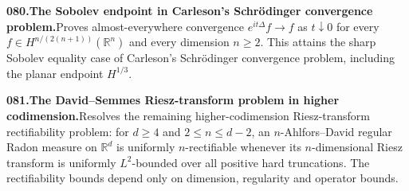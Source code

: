 \documentclass[11pt,a4paper]{article}
\begin{document}
  \par \begin{minipage}{\linewidth}
  \fontsize{10.5}{12.6}\selectfont\RaggedRight
  \hypertarget{result 080}{}
  {\bfseries\textcolor{muted}{080.}\enspace The Sobolev endpoint in Carleson's Schr\"odinger convergence problem.}\enspace Proves almost-everywhere convergence $e^{it\Delta}f\to f$ as $t\downarrow0$ for every $f\in H^{n/(2(n+1))}(\mathbb R^n)$ and every dimension $n\ge2$. This attains the sharp Sobolev equality case of Carleson's Schr\"odinger convergence problem, including the planar endpoint $H^{1/3}$.\par
  \end{minipage}\par\vspace{5pt}



  \par \begin{minipage}{\linewidth}
  \fontsize{10.5}{12.6}\selectfont\RaggedRight
  \hypertarget{result 081}{}
  {\bfseries\textcolor{muted}{081.}\enspace The David--Semmes Riesz-transform problem in higher codimension.}\enspace Resolves the remaining higher-codimension Riesz-transform rectifiability problem: for $d\ge4$ and $2\le n\le d-2$, an $n$-Ahlfors--David regular Radon measure on $\mathbb R^d$ is uniformly $n$-rectifiable whenever its $n$-dimensional Riesz transform is uniformly $L^2$-bounded over all positive hard truncations. The rectifiability bounds depend only on dimension, regularity and operator bounds.\par
  \end{minipage}\par\vspace{5pt}
\end{document}
